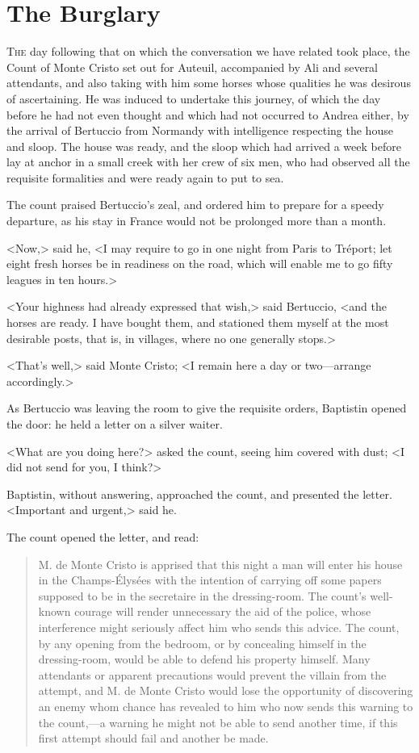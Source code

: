 \chapter{The Burglary} 

 \lettrine{T}{he} day following that on which the conversation we have related took place, the Count of Monte Cristo set out for Auteuil, accompanied by Ali and several attendants, and also taking with him some horses whose qualities he was desirous of ascertaining. He was induced to undertake this journey, of which the day before he had not even thought and which had not occurred to Andrea either, by the arrival of Bertuccio from Normandy with intelligence respecting the house and sloop. The house was ready, and the sloop which had arrived a week before lay at anchor in a small creek with her crew of six men, who had observed all the requisite formalities and were ready again to put to sea. 

 The count praised Bertuccio's zeal, and ordered him to prepare for a speedy departure, as his stay in France would not be prolonged more than a month. 

 <Now,> said he, <I may require to go in one night from Paris to Tréport; let eight fresh horses be in readiness on the road, which will enable me to go fifty leagues in ten hours.> 

 <Your highness had already expressed that wish,> said Bertuccio, <and the horses are ready. I have bought them, and stationed them myself at the most desirable posts, that is, in villages, where no one generally stops.> 

 <That's well,> said Monte Cristo; <I remain here a day or two—arrange accordingly.> 

 As Bertuccio was leaving the room to give the requisite orders, Baptistin opened the door: he held a letter on a silver waiter. 

 <What are you doing here?> asked the count, seeing him covered with dust; <I did not send for you, I think?> 

 Baptistin, without answering, approached the count, and presented the letter. <Important and urgent,> said he. 

 The count opened the letter, and read: 
 \begin{quote}
M. de Monte Cristo is apprised that this night a man will enter his house in the Champs-Élysées with the intention of carrying off some papers supposed to be in the secretaire in the dressing-room. The count's well-known courage will render unnecessary the aid of the police, whose interference might seriously affect him who sends this advice. The count, by any opening from the bedroom, or by concealing himself in the dressing-room, would be able to defend his property himself. Many attendants or apparent precautions would prevent the villain from the attempt, and M. de Monte Cristo would lose the opportunity of discovering an enemy whom chance has revealed to him who now sends this warning to the count,—a warning he might not be able to send another time, if this first attempt should fail and another be made.
\end{quote}

